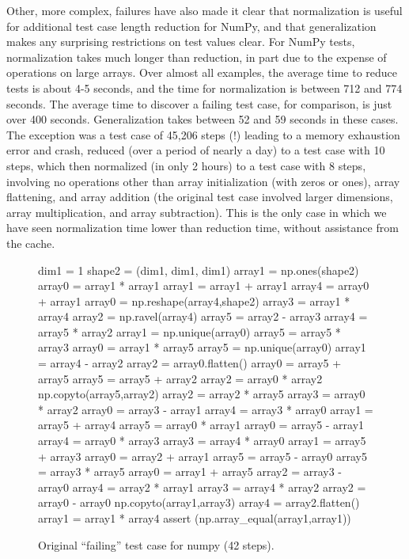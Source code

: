 Other, more complex, failures have also made it clear that normalization
is useful for additional test case length reduction for NumPy, and
that generalization makes any surprising restrictions on test values
clear.  For NumPy tests, normalization takes much longer than
reduction, in part due to the expense of operations on large arrays.
Over almost all examples, the average time to reduce tests is about
4-5 seconds, and the time for normalization is between 712 and 774
seconds.  The average time to discover a failing test case, for
comparison, is just over 400 seconds.  Generalization takes between 52
and 59 seconds in these cases.  The exception was a test case of
45,206 steps (!)  leading to a memory exhaustion error and crash,
reduced (over a period of nearly a day) to a test case with 10 steps,
which then normalized (in only 2 hours) to a test case with 8 steps,
involving no operations other than array initialization (with zeros or
ones), array flattening, and array addition (the original test case
involved larger dimensions, array multiplication, and array
subtraction).  This is the only case in which we have seen
normalization time lower than reduction time, without assistance from
the cache.

\begin{figure}
{\scriptsize
\begin{code}
 dim1 = 1 
 shape2 = (dim1, dim1, dim1) 
 array1 = np.ones(shape2) 
 array0 = array1 * array1 
 array1 = array1 + array1 
 array4 = array0 + array1 
 array0 = np.reshape(array4,shape2) 
 array3 = array1 * array4 
 array2 = np.ravel(array4) 
 array5 = array2 - array3 
 array4 = array5 * array2 
 array1 = np.unique(array0) 
 array5 = array5 * array3 
 array0 = array1 * array5 
 array5 = np.unique(array0) 
 array1 = array4 - array2 
 array2 = array0.flatten() 
 array0 = array5 + array5 
 array5 = array5 + array2 
 array2 = array0 * array2 
 np.copyto(array5,array2) 
 array2 = array2 * array5 
 array3 = array0 * array2 
 array0 = array3 - array1 
 array4 = array3 * array0 
 array1 = array5 + array4 
 array5 = array0 * array1 
 array0 = array5 - array1 
 array4 = array0 * array3 
 array3 = array4 * array0 
 array1 = array5 + array3 
 array0 = array2 + array1 
 array5 = array5 - array0 
 array5 = array3 * array5 
 array0 = array1 + array5 
 array2 = array3 - array0 
 array4 = array2 * array1 
 array3 = array4 * array2 
 array2 = array0 - array0 
 np.copyto(array1,array3) 
 array4 = array2.flatten() 
 array1 = array1 * array4
 assert (np.array\_equal(array1,array1))
\end{code}
}
\caption{Original ``failing'' test case for numpy (42 steps).}
\label{numpyorig}
\end{figure}

